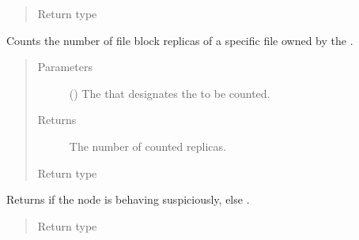\documentclass[letterpaper,10pt,english]{sphinxmanual}
\begin{document}
\begin{fulllineitems}
\begin{fulllineitems}
\begin{quote}
\begin{description}
\item[{Return type}] \leavevmode
{\hyperref[\detokenize{app:app.type_hints.ReplicasDict}]{}}

\end{description}\end{quote}

\end{fulllineitems}


\begin{fulllineitems}
\label{\detokenize{app.domain:app.domain.network_nodes.Node.get_file_parts_count}}
Counts the number of file block replicas of a specific file owned
by the .
\begin{quote}\begin{description}
\item[{Parameters}] \leavevmode
{} () \textendash{} The {\hyperref[\detokenize{app.domain.helpers:app.domain.helpers.smart_dataclasses.FileData.name}]{}} that
designates the {\hyperref[\detokenize{app.domain.helpers:app.domain.helpers.smart_dataclasses.FileBlockData}]{}}
to be counted.

\item[{Returns}] \leavevmode
The number of counted replicas.

\item[{Return type}] \leavevmode
{}

\end{description}\end{quote}

\end{fulllineitems}


\begin{fulllineitems}
\label{\detokenize{app.domain:app.domain.network_nodes.Node.is_suspect}}
Returns  if the node is behaving suspiciously,
else .
\begin{quote}\begin{description}
\item[{Return type}] \leavevmode
{}


\end{description}
\end{quote}
\end{fulllineitems}
\end{fulllineitems}
\end{document}
